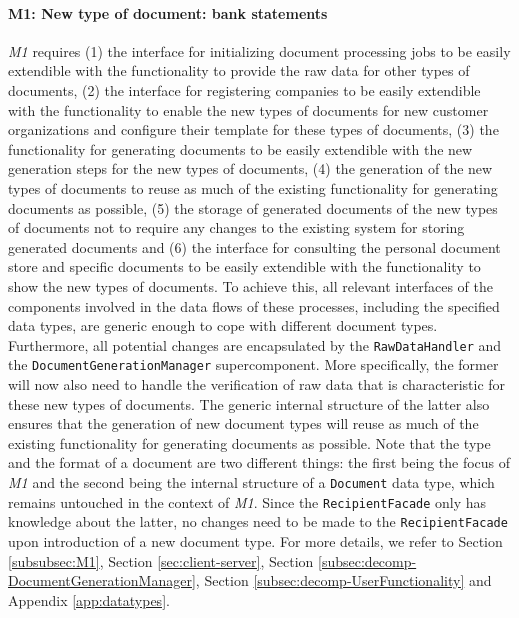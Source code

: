 \documentclass[a4paper,10pt]{article}
\begin{document}
\paragraph{M1\@: New type of document: bank statements}
\textit{M1} requires (1) the interface for initializing document processing jobs to be easily extendible with the functionality to provide the raw data for other types of documents, (2) the interface for registering companies to be easily extendible with the functionality to enable the new types of documents for new customer organizations and configure their template for these types of documents, (3) the functionality for generating documents to be easily extendible with the new generation steps for the new types of documents, (4) the generation of the new types of documents to reuse as much of the existing functionality for generating documents as possible, (5) the storage of generated documents of the new types of documents not to require any changes to the existing system for storing generated documents and (6) the interface for consulting the personal document store and specific documents to be easily extendible with the functionality to show the new types of documents. To achieve this, all relevant interfaces of the components involved in the data flows of these processes, including the specified data types, are generic enough to cope with different document types. Furthermore, all potential changes are encapsulated by the \texttt{RawDataHandler} and the \texttt{DocumentGenerationManager} supercomponent. More specifically, the former will now also need to handle the verification of raw data that is characteristic for these new types of documents. The generic internal structure of the latter also ensures that the generation of new document types will reuse as much of the existing functionality for generating documents as possible. Note that the type and the format of a document are two different things: the first being the focus of \textit{M1} and the second being the internal structure of a \texttt{Document} data type, which remains untouched in the context of \textit{M1}. Since the \texttt{RecipientFacade} only has knowledge about the latter, no changes need to be made to the \texttt{RecipientFacade} upon introduction of a new document type.
For more details, we refer to Section \ref{subsubsec:M1}, Section \ref{sec:client-server}, Section \ref{subsec:decomp-DocumentGenerationManager}, Section \ref{subsec:decomp-UserFunctionality} and Appendix \ref*{app:datatypes}.
\end{document}
